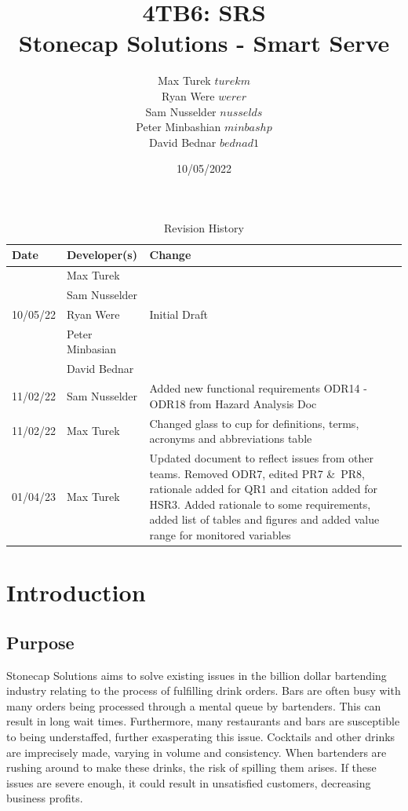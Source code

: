 \documentclass{article}
\title{\textbf{4TB6: SRS}\\
\addlinespace
\addlinespace
\addlinespace
\addlinespace
\large \textbf{Stonecap Solutions - Smart Serve}
\addlinespace
\addlinespace
\addlinespace
\addlinespace}
\author{Max Turek $turekm$\\Ryan Were $werer$\\Sam Nusselder $nusselds$\\Peter Minbashian $minbashp$\\David Bednar $bednad1$}
\date{10/05/2022}
\begin{document}
\maketitle
\newpage
\tableofcontents
\listoffigures
\listoftables

\newpage

    \begin{table}[hp]
    \caption{Revision History} \label{TblRevisionHistory}
    \hline
        \begin{tabularx}{\textwidth}{llX}
        \toprule
        \textbf{Date} & \textbf{Developer(s)} & \textbf{Change}\\
        \midrule
        & Max Turek & \\
        & Sam Nusselder &  \\
        10/05/22 & Ryan Were & Initial Draft\\
        & Peter Minbasian & \\
        & David Bednar & \\
        \bottomrule
        \hline
        \toprule
        \midrule
        11/02/22 & Sam Nusselder & Added new functional requirements ODR14 - ODR18 from Hazard Analysis Doc\\
        \bottomrule
        \hline
        \toprule
        \midrule
        11/02/22 & Max Turek & Changed glass to cup for definitions, terms, acronyms and abbreviations table \\
        \bottomrule
        \hline
        \toprule
        \midrule
        01/04/23 & Max Turek & Updated document to reflect issues from other teams. Removed ODR7, edited PR7 \&\ PR8, rationale added for QR1 and citation added for HSR3. Added rationale to some requirements, added list of tables and figures and added value range for monitored variables\\
        \bottomrule
        \end{tabularx}
    \end{table}

\newpage
\section{Introduction}
\subsection{Purpose} %
    Stonecap Solutions aims to solve existing issues in the billion dollar bartending industry relating to the process of fulfilling drink orders. Bars are often busy with many orders being processed through a mental queue by bartenders. This can result in long wait times. Furthermore, many restaurants and bars are susceptible to being understaffed, further exasperating this issue. Cocktails and other drinks are imprecisely made, varying in volume and consistency. When bartenders are rushing around to make these drinks, the risk of spilling them arises. If these issues are severe enough, it could result in unsatisfied customers, decreasing business profits. \\
\end{document}
